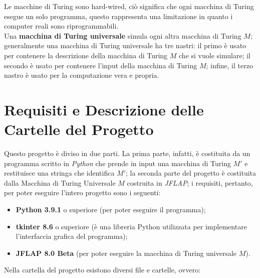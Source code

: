 \documentclass[a4paper,12pt,titlepage,oneside]{book}
\begin{document}
Le macchine di Turing sono \foreignlanguage{english}{hard-wired}, ciò significa che ogni macchina di Turing esegue un solo programma, questo rappresenta una limitazione in quanto i computer reali sono riprogrammabili.\\
Una \textbf{macchina di Turing universale} simula ogni altra macchina di Turing $M$; generalmente una macchina di Turing universale ha tre nastri: il primo è usato per contenere la descrizione della macchina di Turing $M$ che si vuole simulare; il secondo è usato per contenere l'input della macchina di Turing $M$; infine, il terzo nastro è usato per la computazione vera e propria.

	\chapter{Requisiti e Descrizione delle Cartelle del Progetto}

Questo progetto è diviso in due parti. La prima parte, infatti, è costituita da un programma scritto in \emph{\foreignlanguage{english}{Python}} che prende in input una macchina di Turing $M'$ e restituisce una stringa che identifica $M'$; la seconda parte del progetto è costituita dalla Macchina di Turing Universale $M$ costruita in \emph{\foreignlanguage{english}{JFLAP}}; i requisiti, pertanto, per poter eseguire l'intero progetto sono i seguenti:

\begin{itemize}
	\item \textbf{{\foreignlanguage{english}{Python} 3.9.1}} o superiore (per poter eseguire il programma);
	\item \textbf{\foreignlanguage{english}{tkinter} 8.6} o superiore (è una libreria \foreignlanguage{english}{Python} utilizzata per implementare l'interfaccia grafica del programma);
	\item \textbf{JFLAP 8.0 Beta} (per poter eseguire la macchina di Turing universale $M$).
\end{itemize}

Nella cartella del progetto esistono diversi \foreignlanguage{english}{file} e cartelle, ovvero:
\end{document}
